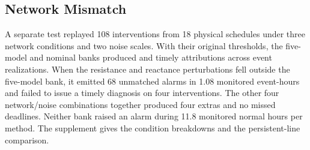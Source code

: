\subsection{Network Mismatch}
A separate test replayed 108 interventions from 18 physical schedules
under three network conditions and two noise scales. With their original
thresholds, the five-model and nominal banks produced \COneMixTimely{}
and \COneNomTimely{} timely attributions across \COneMixTotal{} event
realizations. When the resistance and reactance perturbations fell
outside the five-model bank, it emitted 68 unmatched alarms in 1.08
monitored event-hours and failed to issue a timely diagnosis on four interventions.
The other four network/noise combinations together produced four extras
and no missed deadlines. Neither bank raised an alarm during 11.8
monitored normal hours per method. The supplement gives the condition
breakdowns and the persistent-line comparison.
